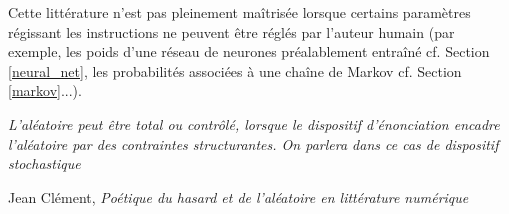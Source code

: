 \documentclass{article}
\newenvironment{citationbox}
{\begin{center}
		\begin{minipage}{.8\textwidth}
		}
		{
		\end{minipage}	
\end{center}
}
\begin{document}
			Cette littérature n'est pas pleinement maîtrisée lorsque certains paramètres régissant les instructions ne peuvent être réglés par l'auteur humain (par exemple, les poids d'une réseau de neurones préalablement entraîné cf. Section \ref{neural_net}, les probabilités associées à une chaîne de Markov cf. Section \ref{markov}...).\\
			\begin{citationbox}
				\textit{L'aléatoire peut être total ou contrôlé, lorsque le dispositif d'énonciation encadre l'aléatoire par des contraintes structurantes. On parlera dans ce cas de dispositif stochastique}
				\begin{flushright}
					Jean Clément, \textit{Poétique du hasard et de l'aléatoire en littérature numérique} \cite{clement2011}
				\end{flushright}
			\end{citationbox}
			
\end{document}
